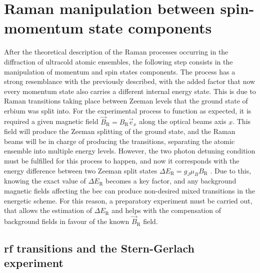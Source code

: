 
\chapter{Raman manipulation between spin-momentum state components}
\label{chap:raman_manipulation}

After the theoretical description of the Raman processes occurring in the diffraction of ultracold atomic ensembles, the following step consists in the manipulation of momentum and spin states components. The process has a strong resemblance with the previously described, with the added factor that now every momentum state also carries a different internal energy state. This is due to Raman transitions taking place between Zeeman levels that the ground state of erbium was split into. For the experimental process to function as expected, it is required a given magnetic field $\vec{B}_\text{R} = B_{\text{R}} \vec{e}_x$ along the optical beams axis $x$. This field will produce the Zeeman splitting of the ground state, and the Raman beams will be in charge of producing the transitions, separating the atomic ensemble into multiple energy levels. However, the two photon detuning condition must be fulfilled for this process to happen, and now it corresponds with the energy difference between two Zeeman split states $\Delta E_\text{R} = g_J \mu_B B_\text{R}$ \cite{Foot2005}. Due to this, knowing the exact value of $\Delta E_\text{R}$ becomes a key factor, and any background magnetic fields affecting the \ac{bec} can produce non-desired mixed transitions in the energetic scheme. For this reason, a preparatory experiment must be carried out, that allows the estimation of $\Delta E_\text{R}$ and helps with the compensation of background fields in favour of the known $\vec{B}_\text{R}$ field.

\section{\Acl{rf} transitions and the Stern-Gerlach experiment}\label{sec:rf_transitions}


